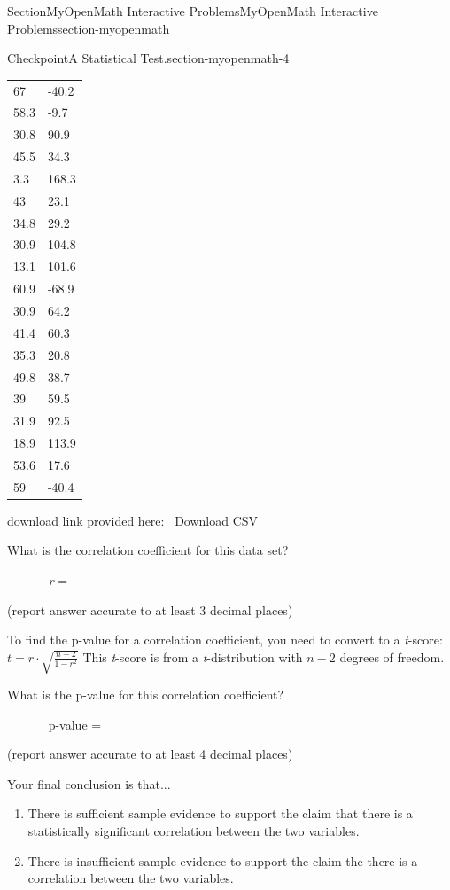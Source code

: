 \documentclass[twoside,10pt,]{article}
\numberwithin{equation}{section}
\begin{document}
\begin{sectionptx}{Section}{MyOpenMath Interactive Problems}{}{MyOpenMath Interactive Problems}{}{}{section-myopenmath}
\begin{inlineexercise}{Checkpoint}{A Statistical Test.}{section-myopenmath-4}
\begin{center}
{\begin{tabular}{ll}
67&-40.2\tabularnewline[0pt]
58.3&-9.7\tabularnewline[0pt]
30.8&90.9\tabularnewline[0pt]
45.5&34.3\tabularnewline[0pt]
3.3&168.3\tabularnewline[0pt]
43&23.1\tabularnewline[0pt]
34.8&29.2\tabularnewline[0pt]
30.9&104.8\tabularnewline[0pt]
13.1&101.6\tabularnewline[0pt]
60.9&-68.9\tabularnewline[0pt]
30.9&64.2\tabularnewline[0pt]
41.4&60.3\tabularnewline[0pt]
35.3&20.8\tabularnewline[0pt]
49.8&38.7\tabularnewline[0pt]
39&59.5\tabularnewline[0pt]
31.9&92.5\tabularnewline[0pt]
18.9&113.9\tabularnewline[0pt]
53.6&17.6\tabularnewline[0pt]
59&-40.4
\end{tabular}
}%
\end{center}%
download link provided here:  \href{denied:data:text/csv;charset=UTF-8,\%22x\%22\%2C\%22y\%22\%0A34.3\%2C86.5\%0A42\%2C45.6\%0A35.5\%2C46.7\%0A42.2\%2C48\%0A0.7\%2C138.9\%0A78.6\%2C-64.7\%0A43.5\%2C50.6\%0A68.2\%2C-45\%0A50.2\%2C17.4\%0A39.1\%2C64.9\%0A78.3\%2C-105.8\%0A30.2\%2C47.5\%0A52.7\%2C19.4\%0A40.8\%2C51\%0A21.5\%2C72.1\%0A57\%2C30.6\%0A67\%2C-40.2\%0A58.3\%2C-9.7\%0A30.8\%2C90.9\%0A45.5\%2C34.3\%0A3.3\%2C168.3\%0A43\%2C23.1\%0A34.8\%2C29.2\%0A30.9\%2C104.8\%0A13.1\%2C101.6\%0A60.9\%2C-68.9\%0A30.9\%2C64.2\%0A41.4\%2C60.3\%0A35.3\%2C20.8\%0A49.8\%2C38.7\%0A39\%2C59.5\%0A31.9\%2C92.5\%0A18.9\%2C113.9\%0A53.6\%2C17.6\%0A59\%2C-40.4}{Download CSV}\footnotemark{}%
\par
What is the correlation coefficient for this data set?%
\par
       \emph{r} = %
\par
(report answer accurate to at least 3 decimal places)%
\par
To find the p-value for a correlation coefficient, you need to convert to a \emph{t}-score: \(\displaystyle{t}={r}\cdot\sqrt{{\frac{{{n}-{2}}}{{{1}-{r}^{{2}}}}}}\) This \emph{t}-score is from a \emph{t}-distribution with \(\displaystyle{n}-{2}\) degrees of freedom.%
\par
What is the p-value for this correlation coefficient?%
\par
       p-value = %
\par
(report answer accurate to at least 4 decimal places)%
\par
Your final conclusion is that...%
\par
%
\begin{enumerate}
\item{}There is sufficient sample evidence to support the claim that there is a statistically significant  correlation between the two variables.%
\item{}There is insufficient sample evidence to support the claim the there is a  correlation between the two variables.%

\end{enumerate}
\end{inlineexercise}
\end{sectionptx}
\end{document}
